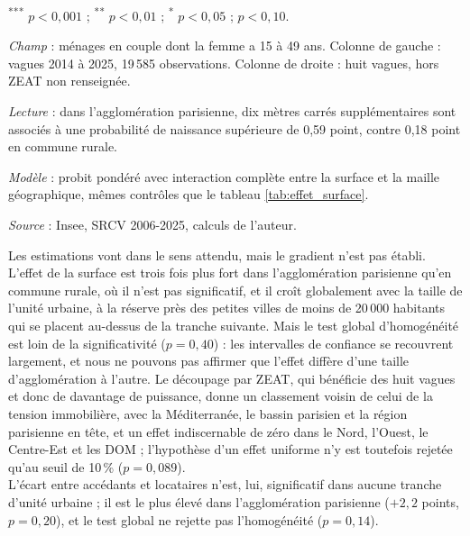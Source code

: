 \documentclass[12pt,a4paper]{article}
\newcommand{\sym}[1]{\textsuperscript{#1}}
\begin{document}
\begin{table}[htbp]
\begin{threeparttable}
		\begin{tablenotes}[flushleft]\scriptsize
			\item \sym{***} $p<0{,}001$ ; \sym{**} $p<0{,}01$ ; \sym{*} $p<0{,}05$ ; \sym{\dag} $p<0{,}10$.
			\item \textit{Champ} : ménages en couple dont la femme a 15 à 49 ans. Colonne de gauche :
			vagues 2014 à 2025, 19\,585 observations. Colonne de droite : huit vagues, hors ZEAT
			non renseignée.
			\item \textit{Lecture} : dans l'agglomération parisienne, dix mètres carrés
			supplémentaires sont associés à une probabilité de naissance supérieure de 0,59 point,
			contre 0,18 point en commune rurale.
			\item \textit{Modèle} : probit pondéré avec interaction complète entre la surface et la
			maille géographique, mêmes contrôles que le tableau \ref{tab:effet_surface}.
			\item \textit{Source} : Insee, SRCV 2006-2025, calculs de l'auteur.
		\end{tablenotes}
	\end{threeparttable}
\end{table}

\bigskip

\noindent Les estimations vont dans le sens attendu, mais le gradient n'est pas établi. L'effet de la surface est trois fois plus fort dans l'agglomération parisienne qu'en commune rurale, où il n'est pas significatif, et il croît globalement avec la taille de l'unité urbaine, à la réserve près des petites villes de moins de 20\,000 habitants qui se placent au-dessus de la tranche suivante. Mais le test global d'homogénéité est loin de la significativité ($p = 0{,}40$) : les intervalles de confiance se recouvrent largement, et nous ne pouvons pas affirmer que l'effet diffère d'une taille d'agglomération à l'autre. Le découpage par ZEAT, qui bénéficie des huit vagues et donc de davantage de puissance, donne un classement voisin de celui de la tension immobilière, avec la Méditerranée, le bassin parisien et la région parisienne en tête, et un effet indiscernable de zéro dans le Nord, l'Ouest, le Centre-Est et les DOM ; l'hypothèse d'un effet uniforme n'y est toutefois rejetée qu'au seuil de 10\,\% ($p = 0{,}089$). \\

\noindent L'écart entre accédants et locataires n'est, lui, significatif dans aucune tranche d'unité urbaine ; il est le plus élevé dans l'agglomération parisienne ($+2{,}2$ points, $p = 0{,}20$), et le test global ne rejette pas l'homogénéité ($p = 0{,}14$). \\
\end{document}
